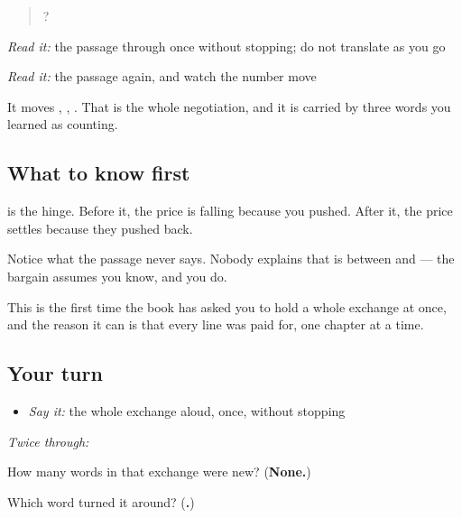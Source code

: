 \begin{tcolorbox}[breakable,skin=enhanced,colback=orange!6,colframe=orange!45!black,boxrule=0.5pt,arc=1mm,left=6pt,right=6pt,top=4pt,bottom=4pt,fonttitle=\bfseries,title={Read this}]
\begin{quote}
      ?                
\end{quote}

\emph{Read it:} the passage through once without stopping; do not translate as you go

\emph{Read it:} the passage again, and watch the number move

It moves , , . That is the whole negotiation, and it is carried by three words you learned as counting.
\end{tcolorbox}

\subsection*{What to know first}
\textbf{} is the hinge. Before it, the price is falling because you pushed. After it, the price settles because they pushed back.

Notice what the passage never says. Nobody explains that  is between  and  — the bargain assumes you know, and you do.

This is the first time the book has asked you to hold a whole exchange at once, and the reason it can is that every line was paid for, one chapter at a time.

\subsection*{Your turn}
\begin{itemize}
\raggedright
  \item \emph{Say it:} the whole exchange aloud, once, without stopping
\end{itemize}

\emph{Twice through:}

\begin{tcolorbox}[breakable,colback=teal!4,colframe=teal!35!black,title={Before you move on}]
How many words in that exchange were new? (\textbf{None.})

Which word turned it around? (\textbf{.})
\end{tcolorbox}
